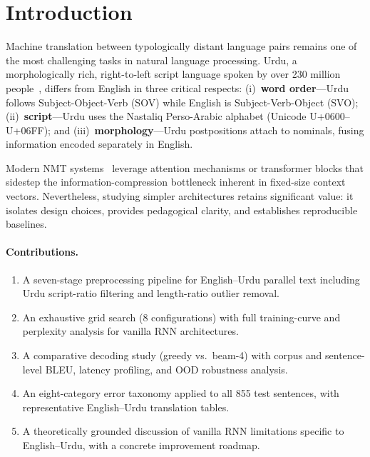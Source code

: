 \documentclass[runningheads]{llncs}
\begin{document}
\section{Introduction}
\label{sec:intro}

Machine translation between typologically distant language pairs remains one of
the most challenging tasks in natural language processing. Urdu, a
morphologically rich, right-to-left script language spoken by over 230 million
people~\cite{ethnologue2023}, differs from English in three critical respects:
(i)~\textbf{word order}---Urdu follows Subject-Object-Verb (SOV) while English
is Subject-Verb-Object (SVO); (ii)~\textbf{script}---Urdu uses the
Nastaliq Perso-Arabic alphabet (Unicode U+0600--U+06FF); and
(iii)~\textbf{morphology}---Urdu postpositions attach to nominals, fusing
information encoded separately in English.

Modern NMT systems~\cite{bahdanau2015,vaswani2017} leverage attention mechanisms
or transformer blocks that sidestep the information-compression bottleneck
inherent in fixed-size context vectors. Nevertheless, studying simpler
architectures retains significant value: it isolates design choices, provides
pedagogical clarity, and establishes reproducible baselines.

\paragraph{Contributions.}
\begin{enumerate}[leftmargin=*,itemsep=1pt]
  \item A seven-stage preprocessing pipeline for English--Urdu parallel text
        including Urdu script-ratio filtering and length-ratio outlier removal.
  \item An exhaustive grid search (8 configurations) with full training-curve
        and perplexity analysis for vanilla RNN architectures.
  \item A comparative decoding study (greedy vs.\ beam-4) with corpus and
        sentence-level BLEU, latency profiling, and OOD robustness analysis.
  \item An eight-category error taxonomy applied to all 855 test sentences,
        with representative English--Urdu translation tables.
  \item A theoretically grounded discussion of vanilla RNN limitations specific
        to English--Urdu, with a concrete improvement roadmap.
\end{enumerate}
\end{document}
